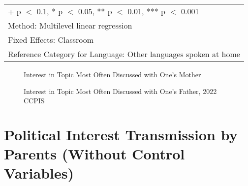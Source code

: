\documentclass[
  letterpaper,
  DIV=11,
  numbers=noendperiod]{scrreprt}
\begin{document}
\begin{table}
\begin{tabular}[t]{lcccccc}
\bottomrule
\multicolumn{7}{l}{\rule{0pt}{1em}+ p $<$ 0.1, * p $<$ 0.05, ** p $<$ 0.01, *** p $<$ 0.001}\\
\multicolumn{7}{l}{\rule{0pt}{1em}Method: Multilevel linear regression}\\
\multicolumn{7}{l}{\rule{0pt}{1em}Fixed Effects: Classroom}\\
\multicolumn{7}{l}{\rule{0pt}{1em}Reference Category for Language: Other languages spoken at home}\\
\end{tabular}
\end{table}

\begin{figure}


\caption{\label{fig-mother}Interest in Topic Most Often Discussed with
One's Mother}

\end{figure}%

\begin{figure}


\caption{\label{fig-father}Interest in Topic Most Often Discussed with
One's Father, 2022 CCPIS}

\end{figure}%

\chapter{Political Interest Transmission by Parents (Without Control
Variables)}\label{sec-appendix6}
\end{document}

